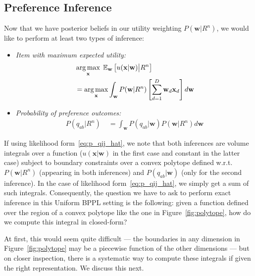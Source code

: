 \documentclass[letterpaper]{article}
\newcommand{\E}{\mathbb{E}}
\renewcommand{\vec}[1]{\mathbf{#1}}
\def\argmax{\operatornamewithlimits{arg\,max}}
\begin{document}
\subsection{Preference Inference}

\label{sec:bppl_inference}


Now that we have posterior beliefs in our utility weighting 
$P(\vec{w}|R^n)$, we would like to perform at least two types of inference:
\begin{itemize}
\item {\it Item with maximum expected utility:} 
\begin{align*}
\label{eq:maxEU}
& \argmax_{\vec{x}} \; \E_{\vec{w}} \left[ u(\vec{x}|\vec{w}) \big| R^n \right]\\ & = \argmax_{\vec{x}} \int_{\vec{w}} P(\vec{w}|R^n) \left[ \sum_{d=1}^{D} \vec{w}_d \vec{x}_d \right] d\vec{w}
\end{align*}
\item {\it Probability of preference outcomes:} 
\begin{align*}
P(q_{ab} | R^n) \; & = \int_\vec{w} P(q_{ab} | \vec{w}) P(\vec{w}|R^n) d\vec{w}
\end{align*}
\end{itemize}
If using likelihood form~\eqref{eq:p_qij_hat}, we note that both
inferences are volume integrals over a function ($u(\vec{x}|\vec{w})$
in the first case and constant in the latter case) subject to boundary
constraints over a convex polytope defined w.r.t.\ $P(\vec{w}|R^n)$
(appearing in both inferences) and $P(q_{ab} | \vec{w})$ (only for the
second inference).  In the case of likelihood
form~\eqref{eq:p_qij_hat}, we simply get a sum of such integrals.
Consequently, the question we have to ask to perform exact inference
in this Uniform BPPL setting is the following: given a function
defined over the region of a convex polytope like the one in
Figure~\ref{fig:polytope}, how do we compute this integral in
closed-form?

At first, this would seem quite difficult --- the boundaries in any
dimension in Figure~\ref{fig:polytope} may be a piecewise function of
the other dimensions --- but on closer inspection, there is a
systematic way to compute these integrals if given the right
representation.  We discuss this next.
\end{document}
